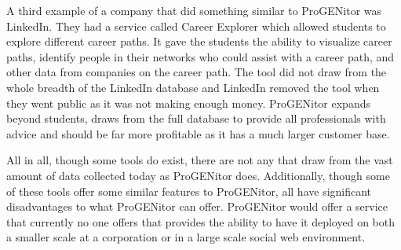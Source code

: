 A third example of a company that did something similar to ProGENitor was
LinkedIn.  They had a service called Career Explorer\cite{careerexplorer} which
allowed students to explore different career paths.  It gave the students the
ability to visualize career paths, identify people in their networks who could
assist with a career path, and other data from companies on the career path. 
The tool did not draw from the whole breadth of the LinkedIn database and
LinkedIn removed the tool when they went public as it was not making enough
money.  ProGENitor expands beyond students, draws from the full database to
provide all professionals with advice and should be far more profitable as it
has a much larger customer base.

All in all, though some tools do exist, there are not any that draw from the
vast amount of data collected today as ProGENitor does.  Additionally, though
some of these tools offer some similar features to ProGENitor, all have
significant disadvantages to what ProGENitor can offer.  ProGENitor would offer
a service that currently no one offers that provides the ability to have it
deployed on both a smaller scale at a corporation or in a large scale social web
environment.
